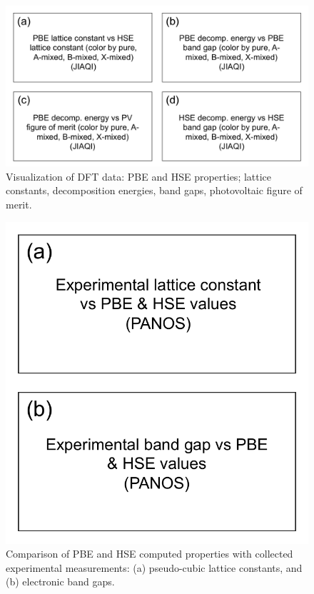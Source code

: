 \documentclass[twoside,twocolumn,9pt]{article}
\begin{document}
\begin{figure}[h]
\centering
\includegraphics[width=0.99\linewidth]{Figure2.pdf}
\caption{\label{Fig:outline} 
Visualization of DFT data: PBE and HSE properties; lattice constants, decomposition energies, band gaps, photovoltaic figure of merit.}
\end{figure}


\begin{figure}[h]
\centering
\includegraphics[width=0.80\linewidth]{Figure3.pdf}
\caption{\label{Fig:outline} 
Comparison of PBE and HSE computed properties with collected experimental measurements: (a) pseudo-cubic lattice constants, and (b) electronic band gaps.}
\end{figure}
\end{document}

